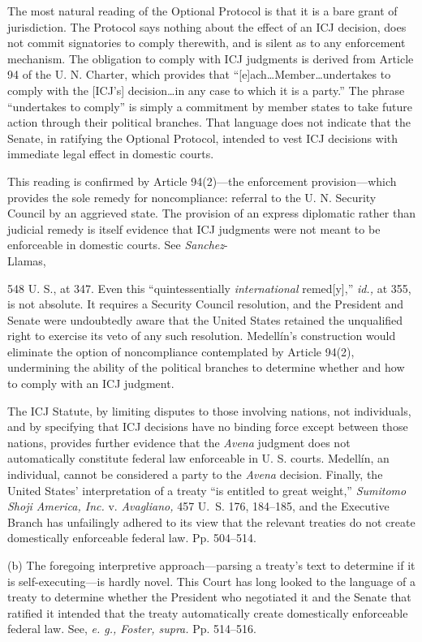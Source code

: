{  The most natural reading of the Optional Protocol is that it is a bare
grant of jurisdiction. The Protocol says nothing about the effect of an
ICJ decision, does not commit signatories to comply therewith, and is
silent as to any enforcement mechanism. The obligation to comply with
ICJ judgments is derived from Article 94 of the U. N. Charter, which
provides that ``[e]ach\dots Member\dots undertakes to comply with
the [ICJ's] decision\dots in any case to which it is a party.''
The phrase ``undertakes to comply'' is simply a commitment by member
states to take future action through their political branches. That
language does not indicate that the Senate, in ratifying the Optional
Protocol, intended to vest ICJ decisions with immediate legal effect in
domestic courts.

  This reading is confirmed by Article 94(2)---the enforcement
provision---which provides the sole remedy for noncompliance: referral
to the U. N. Security Council by an aggrieved state. The provision of
an express diplomatic rather than judicial remedy is itself evidence
that ICJ judgments were not meant to be enforceable in domestic
courts. See \emph{Sanchez}-\\Llamas,} 548 U. S., at 347. Even this
``quintessentially \emph{international} remed[y],'' \emph{id.,} at
355, is not absolute. It requires a Security Council resolution,
and the President and Senate were undoubtedly aware that the United
States retained the unqualified right to exercise its veto of any such
resolution. Medellín's construction would eliminate the option of
noncompliance contemplated by Article 94(2), undermining the ability of
the political branches to determine whether and how to comply with an
ICJ judgment.

  The ICJ Statute, by limiting disputes to those involving nations,
not individuals, and by specifying that ICJ decisions have no binding
force except between those nations, provides further evidence that
the \emph{Avena} judgment does not automatically constitute federal law
enforceable in U. S. courts. Medellín, an individual, cannot be
considered a party to the \emph{Avena} decision. Finally, the United
States' interpretation of a treaty ``is entitled to great weight,''
\emph{Sumitomo Shoji America, Inc.} v. \emph{Avagliano,} 457 U.~S. 176,
184--185, and the Executive Branch has unfailingly adhered to its
view that the relevant treaties do not create domestically enforceable
federal law. Pp. 504--514.

  (b) The foregoing interpretive approach---parsing a treaty's text to
determine if it is self-executing---is hardly novel. This Court has long
looked to the language of a treaty to determine whether the President
who negotiated it and the Senate that ratified it intended that the
treaty \newpage  automatically create domestically enforceable federal
law. See, \emph{e. g., Foster, supra.} Pp. 514--516.

